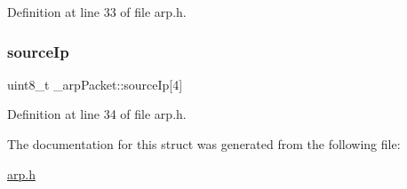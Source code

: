 Definition at line 33 of file arp.\+h.

\mbox{\label{struct__arpPacket_ac403f730ac761759e99f7896c396b5d7}} 
\subsubsection{\texorpdfstring{source\+Ip}{sourceIp}}
{\footnotesize\ttfamily uint8\+\_\+t \+\_\+arp\+Packet\+::source\+Ip\mbox{[}4\mbox{]}}



Definition at line 34 of file arp.\+h.



The documentation for this struct was generated from the following file\+:\begin{DoxyCompactItemize}
\item 
\hyperlink{arp_8h}{arp.\+h}\end{DoxyCompactItemize}
